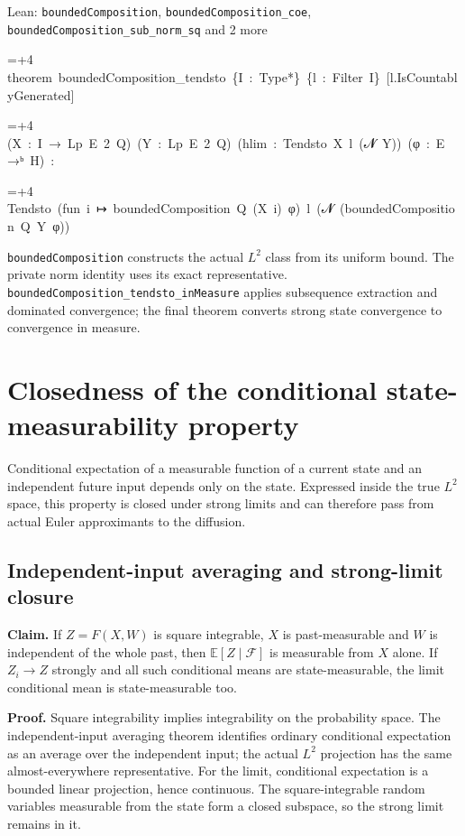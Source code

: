 \documentclass[11pt,a4paper]{report}
\newlength{\leancharwidth}
\newenvironment{leancode}{\par\smallskip\begingroup\ttfamily\footnotesize\raggedright
  \settowidth{\leancharwidth}{M}\setlength{\parskip}{0pt}\setlength{\parindent}{0pt}
  \frenchspacing}{\par\endgroup\smallskip}
\newcommand{\leanline}[2]{\hangindent=\dimexpr#1\leancharwidth+4\leancharwidth\relax
  \hangafter=1\noindent\hspace*{#1\leancharwidth}#2\par}
\newcommand{\leanlabel}[1]{\par\smallskip\noindent{\small\bfseries #1}\par}
\begin{document}
\begin{leanbox}{Lean: \texttt{boundedComposition}, \texttt{boundedComposition\_\allowbreak{}coe}, \texttt{boundedComposition\_\allowbreak{}sub\_\allowbreak{}norm\_\allowbreak{}sq} and 2 more}
\begin{leancode}
\leanline{0}{theorem\ boundedComposition\_tendsto\ \{I\ :\ Type*\}\ \{l\ :\ Filter\ I\}\ [l.IsCountablyGenerated]}
\leanline{4}{(X\ :\ I\ →\ Lp\ E\ 2\ Q)\ (Y\ :\ Lp\ E\ 2\ Q)\ (hlim\ :\ Tendsto\ X\ l\ ({\leanfallback 𝓝}\ Y))\ (φ\ :\ E\ →ᵇ\ H)\ :}
\leanline{4}{Tendsto\ (fun\ i\ ↦\ boundedComposition\ Q\ (X\ i)\ φ)\ l\ ({\leanfallback 𝓝}\ (boundedComposition\ Q\ Y\ φ))}
\end{leancode}
\leanlabel{How the Lean proof follows the argument}
\texttt{bounded\allowbreak{}Composition} constructs the actual \(L^2\) class from its uniform bound. The private norm identity uses its exact representative. \texttt{bounded\allowbreak{}Composition\_\allowbreak{}tendsto\_\allowbreak{}in\allowbreak{}Measure} applies subsequence extraction and dominated convergence; the final theorem converts strong state convergence to convergence in measure.
\end{leanbox}
\section{\texorpdfstring{Closedness of the conditional state-measurability property}{Closedness of the conditional state-measurability property}}
\label{proof-module-WassersteinMixing-ConditionalMarkovClosure-lean}


Conditional expectation of a measurable function of a current state and an independent future input depends only on the state. Expressed inside the true \(L^2\) space, this property is closed under strong limits and can therefore pass from actual Euler approximants to the diffusion.

\subsection{\texorpdfstring{Independent-input averaging and strong-limit closure}{Independent-input averaging and strong-limit closure}}
\label{report-step-WassersteinMixing-ConditionalMarkovClosure-lean-1}


\textbf{Claim.} If \(Z=F(X,W)\) is square integrable, \(X\) is past-measurable and \(W\) is independent of the whole past, then \(\mathbb E[Z\mid\mathcal F]\) is measurable from \(X\) alone. If \(Z_i\to Z\) strongly and all such conditional means are state-measurable, the limit conditional mean is state-measurable too.



\textbf{Proof.} Square integrability implies integrability on the probability space. The independent-input averaging theorem identifies ordinary conditional expectation as an average over the independent input; the actual \(L^2\) projection has the same almost-everywhere representative. For the limit, conditional expectation is a bounded linear projection, hence continuous. The square-integrable random variables measurable from the state form a closed subspace, so the strong limit remains in it.
\end{document}
